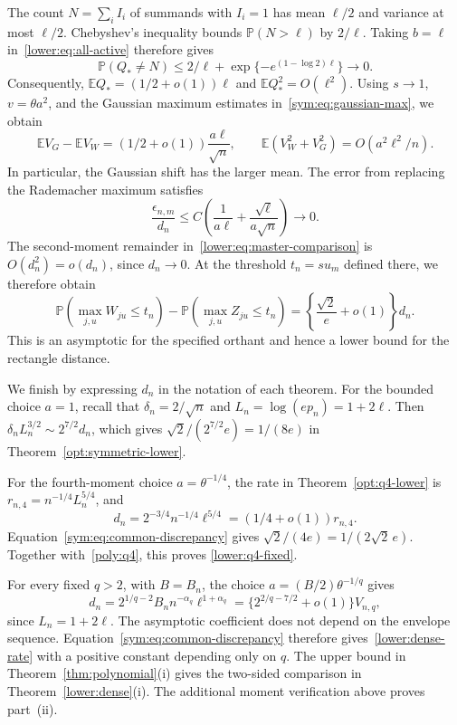 \documentclass[11pt,letterpaper]{article}
\newenvironment{recovered}{}{}
\theoremstyle{remark}
\newcommand{\E}{\mathbb E}
\newcommand{\Pp}{\mathbb P}
\begin{document}
{The count \(N=\sum_iI_i\) of summands with \(I_i=1\) has mean \(\ell/2\) and variance at most \(\ell/2\).}
\begin{recovered}
Chebyshev's inequality bounds \(\Pp(N>\ell)\) by \(2/\ell\).
Taking \(b=\ell\) in~\eqref{lower:eq:all-active} therefore gives
\end{recovered}
\[
 \Pp(Q_*\ne N)\le 2/\ell+
       \exp\{-e^{(1-\log2)\ell}\}\longrightarrow0.
\]
Consequently, \(\E Q_*=(1/2+o(1))\ell\) and
\(\E Q_*^2=O(\ell^2)\).
\begin{recovered}
Using \(s\to1\), \(v=\theta a^2\), and the Gaussian maximum
estimates in~\eqref{sym:eq:gaussian-max}, we obtain
\end{recovered}
\[
 \E V_G-\E V_W=(1/2+o(1))\frac{a\ell}{\sqrt n},
 \qquad
 \E(V_W^2+V_G^2)=O(a^2\ell^2/n).
\]
In particular, the Gaussian shift has the larger mean.
The error from replacing the Rademacher maximum satisfies
\[
 \frac{\epsilon_{n,m}}{d_n}
 \le C\left(\frac1{a\ell}+\frac{\sqrt\ell}{a\sqrt n}\right)\to0.
\]
\begin{recovered}
The second-moment remainder in~\eqref{lower:eq:master-comparison}
is \(O(d_n^2)=o(d_n)\), since \(d_n\to0\).
At the threshold \(t_n=su_m\) defined there, we therefore obtain
\end{recovered}
\begin{equation}
 \Pp(\max_{j,u}W_{ju}\le t_n)-\Pp(\max_{j,u}Z_{ju}\le t_n)
 =\left\{\frac{\sqrt2}{e}+o(1)\right\}d_n.
 \label{sym:eq:common-discrepancy}
\end{equation}
This is an asymptotic for the specified orthant and hence a lower
bound for the rectangle distance.

We finish by expressing \(d_n\) in the notation of each theorem.
For the bounded choice \(a=1\), recall that
\(\delta_n=2/\sqrt n\) and \(L_n=\log(ep_n)=1+2\ell\).
Then \(\delta_nL_n^{3/2}\sim2^{7/2}d_n\), which gives
\(\sqrt2/(2^{7/2}e)=1/(8e)\) in
Theorem~\ref{opt:symmetric-lower}.

For the fourth-moment choice \(a=\theta^{-1/4}\), the rate in
Theorem~\ref{opt:q4-lower} is \(r_{n,4}=n^{-1/4}L_n^{5/4}\), and
\[
 d_n=2^{-3/4}n^{-1/4}\ell^{5/4}
       =(1/4+o(1))r_{n,4}.
\]
Equation~\eqref{sym:eq:common-discrepancy} gives
\(\sqrt2/(4e)=1/(2\sqrt2\,e)\).
Together with~\eqref{poly:q4}, this proves
\eqref{lower:q4-fixed}.

\begin{recovered}
For every fixed \(q>2\), with \(B=B_n\), the choice
\(a=(B/2)\theta^{-1/q}\) gives
\[
 d_n=2^{1/q-2}B_n n^{-\alpha_q}\ell^{1+\alpha_q}
     =\{2^{2/q-7/2}+o(1)\}V_{n,q},
\]
since \(L_n=1+2\ell\). The asymptotic coefficient does not depend on
the envelope sequence. Equation~\eqref{sym:eq:common-discrepancy}
therefore gives~\eqref{lower:dense-rate} with a positive constant
depending only on \(q\). The upper bound in
Theorem~\ref{thm:polynomial}\textup{(i)} gives the two-sided comparison
in Theorem~\ref{lower:dense}\textup{(i)}. The additional moment
verification above proves part~\textup{(ii)}.
\end{recovered}
\end{document}
